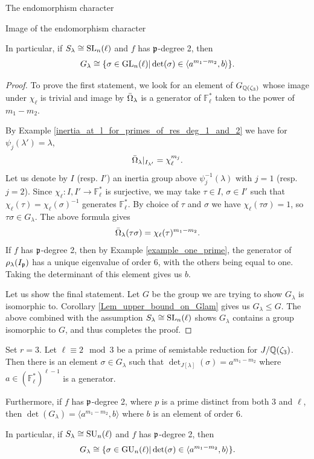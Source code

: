 \documentclass[11pt,a4paper]{article}
\newcommand{\Fl}{\mathbb{F}_\ell}
\newcommand{\Gcyclo}[1]{G_{\QQ(\zeta_{#1})}}
\newcommand{\Glam}{G_{\lambda}}
\newcommand{\Slam}{S_{\lambda}}
\begin{document}
\begin{section}{The endomorphism character}
\begin{subsection}{Image of the endomorphism character}
\begin{proposition}
  In particular, if $\Slam \cong \SL_n(\ell)$ and $f$ has $\mathfrak{p}$-degree 2, then 
 \[\Glam \cong  \{ \sigma \in \GL_n(\ell)| \det(\sigma) \in \langle a^{m_1-m_2},b\rangle \}.
\]
\end{proposition}

\begin{proof}
To prove the first statement, we look for an element of $\Gcyclo{3}$ whose image under $\chi_\ell$ is trivial and image by $\Bar{\Omega}_\lambda$ is a generator of $\Fl^*$ taken to the power of $m_1-m_2$.


By Example \ref{inertia_at_l_for_primes_of_res_deg_1_and_2} we have for $ \psi_j(\lambda') = \lambda$,
\[
\Bar{\Omega}_\lambda|_{I_{\lambda'}} = \chi_\ell^{m_j}.
\]
Let us denote by $I$ (resp. $I'$) an inertia group above $\psi^{-1}_j(\lambda)$ with $j= 1$ (resp.  $j= 2$). Since $\chi_\ell:I,I' \rightarrow \Fl^*$ is surjective, we may take $\tau \in I$, $\sigma \in I'$ such that $\chi_\ell(\tau)= \chi_\ell(\sigma)^{-1}$ generates $\Fl^*$. By choice of $\tau$ and $\sigma$ we have $\chi_\ell(\tau \sigma)=1$, so $\tau\sigma \in \Glam$. The above formula gives
\[
\Bar{\Omega}_\lambda(\tau \sigma) = \chi_\ell(\tau)^{m_1-m_2}.
\]
If $f$ has $\mathfrak{p}$-degree 2, then by Example \ref{example_one_prime}, the generator of $\rho_\lambda(I_{\mathfrak{p}})$ has a unique eigenvalue of order $6$, with the others being equal to one. Taking the determinant of this element gives us $b$. 

Let us show the final statement. Let $G$ be the group we are trying to show $\Glam$ is isomorphic to. Corollary \ref{Lem_upper_bound_on_Glam} gives us $\Glam \leq G$. The above combined with the assumption $\Slam \cong \SL_n(\ell)$ shows $\Glam$ contains a group isomorphic to $G$, and thus completes the proof. 
\end{proof}


\begin{proposition}
\label{Prop_l_2_mod_3_full_Glam}
Set $r =3$. Let $\ell \equiv 2 \mod{3}$ be a prime of semistable reduction for $J/\mathbb{Q}(\zeta_3)$. Then there is an element $\sigma \in \Glam$ such that $\det_{J[\lambda]}(\sigma) = a^{m_1-m_2}$ where $a \in (\Fl^*)^{\ell-1}$ is a generator.

Furthermore, if $f$ has $\mathfrak{p}$-degree 2, where $p$ is a prime distinct from both $3$ and $\ell$, then $\det(\Glam)= \langle a^{m_1-m_2},b\rangle $
 where $b$ is an element of order $6$.
 
 In particular, if $\Slam \cong \SU_n(\ell)$ and $f$ has $\mathfrak{p}$-degree 2, then 
 \[\Glam \cong  \{ \sigma \in \GU_n(\ell)| \det(\sigma) \in \langle a^{m_1-m_2},b\rangle \}.
\]
\end{proposition}


\end{subsection}
\end{section}
\end{document}
